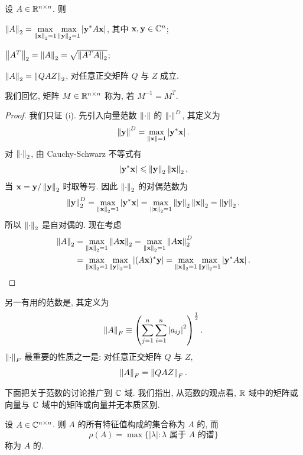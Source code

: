 \begin{theorem}
\label{thm:3-3}
设 $A\in\mathbb{R}^{n\times n}$. 则
\begin{romanlist}
  \item $\displaystyle\left\|A\right\|_2=\max_{\left\|\mathbf{x}\right\|_2=1}\max_{\left\|\mathbf{y}\right\|_2=1}\left|\mathbf{y}^*A\mathbf{x}\right|$, 其中 $\mathbf{x},\mathbf{y}\in\mathbb{C}^n$;
  \item $\left\|A^T\right\|_2=\left\|A\right\|_2=\sqrt{\left\|A^TA\right\|_2}$;
  \item $\left\|A\right\|_2=\left\|QAZ\right\|_2$, 对任意正交矩阵 $Q$ 与 $Z$ 成立.
\end{romanlist}
我们回忆, 矩阵 $M\in\mathbb{R}^{n\times n}$ 称为, 若 $M^{-1}=M^T$.
\end{theorem}

\begin{proof}
我们只证 (i). 先引入向量范数 $\left\|\cdot\right\|$ 的 $\left\|\cdot\right\|^D$, 其定义为
\[
  \left\|\mathbf{y}\right\|^D=\max_{\left\|\mathbf{x}\right\|=1}\left|\mathbf{y}^*\mathbf{x}\right|.
\]
对 $\left\|\cdot\right\|_2$, 由 Cauchy-Schwarz 不等式有
\[
  \left|\mathbf{y}^*\mathbf{x}\right|\leqslant\left\|\mathbf{y}\right\|_2\left\|\mathbf{x}\right\|_2,
\]
当 $\mathbf{x}=\mathbf{y}/\left\|\mathbf{y}\right\|_2$ 时取等号. 因此 $\left\|\cdot\right\|_2$ 的对偶范数为
\[
  \left\|\mathbf{y}\right\|_2^D=\max_{\left\|\mathbf{x}\right\|_2=1}\left|\mathbf{y}^*\mathbf{x}\right|
  =\max_{\left\|\mathbf{x}\right\|_2=1}\left\|\mathbf{y}\right\|_2\left\|\mathbf{x}\right\|_2=\left\|\mathbf{y}\right\|_2.
\]
所以 $\left\|\cdot\right\|_2$ 是自对偶的. 现在考虑
\[
  \begin{aligned}
    \left\|A\right\|_2
    &=\max_{\left\|\mathbf{x}\right\|_2=1}\left\|A\mathbf{x}\right\|_2
      =\max_{\left\|\mathbf{x}\right\|_2=1}\left\|A\mathbf{x}\right\|_2^D\\
    &=\max_{\left\|\mathbf{x}\right\|_2=1}\max_{\left\|\mathbf{y}\right\|_2=1}\left|(A\mathbf{x})^*\mathbf{y}\right|
      =\max_{\left\|\mathbf{x}\right\|_2=1}\max_{\left\|\mathbf{y}\right\|_2=1}\left|\mathbf{y}^*A\mathbf{x}\right|.
  \end{aligned}
\]
\end{proof}

另一有用的范数是, 其定义为
\[
  \left\|A\right\|_F\equiv\left(\sum_{j=1}^{n}\sum_{i=1}^{n}\left|a_{ij}\right|^2\right)^{\frac{1}{2}}.
\]
$\left\|\cdot\right\|_F$ 最重要的性质之一是: 对任意正交矩阵 $Q$ 与 $Z$,
\[
  \left\|A\right\|_F=\left\|QAZ\right\|_F.
\]

下面把关于范数的讨论推广到 $\mathbb{C}$ 域. 我们指出, 从范数的观点看, $\mathbb{R}$ 域中的矩阵或向量与 $\mathbb{C}$ 域中的矩阵或向量并无本质区别.

\begin{definition}
\label{def:3-4}
设 $A\in\mathbb{C}^{n\times n}$. 则 $A$ 的所有特征值构成的集合称为 $A$ 的, 而
\[
  \rho(A)=\max\{|\lambda|:\lambda\text{ 属于 }A\text{ 的谱}\}
\]
称为 $A$ 的.
\end{definition}

